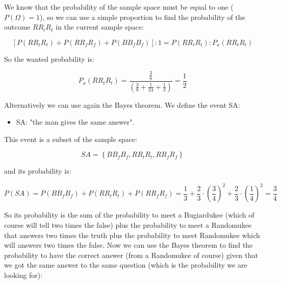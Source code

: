 \documentclass{article}
\begin{document}
We know that the probability of the sample space must be equal to one ($P(\Omega) = 1$), so we can use a simple proportion to find the probability of the outcome $RR_{t}R_{t}$ in the current sample space:

\begin{equation} \label{eq:proportion2.2}
[ P(RR_{t}R_{t}) + P(RR_{f}R_{f}) + P(BB_{f}B_{f}) ] : 1 = P(RR_{t}R_{t}) : P_{x}(RR_{t}R_{t}) 
\end{equation}

So the wanted probability is:

\begin{equation} \label{eq:proportion2.21}
P_{x}(RR_{t}R_{t}) = \frac  { \frac {3} {8} }  { ( \frac {3} {8} + \frac {1} {24} + \frac {1} {3} ) } = \frac {1} {2}
\end{equation}

\vspace{20 mm}

Alternatively we can use again the Bayes theorem. 
We define the event SA:

\begin{itemize}
	\item SA: "the man gives the same answer". 
\end {itemize}

This event is a subset of the sample space:

\begin{equation} \label{eq:sameanswer}
SA = \left\{ {BB_{f}B_{f}, RR_{t}R_{t}, RR_{f}R_{f}} \right\}
\end{equation}

and its probability is:

\begin{equation} \label{eq:sameanswerprob}
P(SA) = P(BB_{f}B_{f}) + P(RR_{t}R_{t}) + P(RR_{f}R_{f}) = \frac {1}{3} + \frac{2}{3} \cdot \left( \frac {3}{4} \right)^2 + \frac {2}{3} \cdot \left( \frac {1}{4} \right)^{2} = \frac {3}{4}
\end{equation} 

So its probability is the sum of the probability to meet a Bugiardukee (which of course will tell two times the false) plus the probability to meet a Randomukee that answers two times the truth plus the probability to meet Randomukee which will answers two times the false.
Now we can use the Bayes theorem to find the probability to have the correct answer (from a Randomukee of course) given that we got the same answer to the same question (which is the probability we are looking for):
\end{document}
